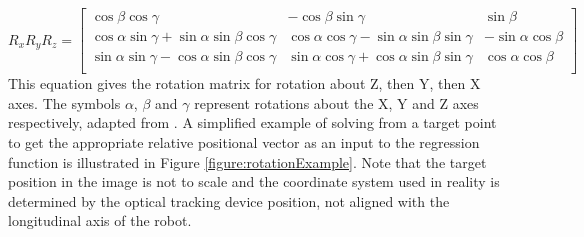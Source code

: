 \documentclass[11pt]{article}
\begin{document}
\begin{equation}\label{equation:rotationMatrix}
R_{x}R_{y}R_{z} = 
\begin{bmatrix*}
\cos\beta\cos\gamma & -\cos\beta\sin\gamma & \sin\beta \\
\cos\alpha\sin\gamma + \sin\alpha\sin\beta\cos\gamma & \cos\alpha\cos\gamma - \sin\alpha\sin\beta\sin\gamma & -\sin\alpha\cos\beta \\
\sin\alpha\sin\gamma - \cos\alpha\sin\beta\cos\gamma & \sin\alpha\cos\gamma + \cos\alpha\sin\beta\sin\gamma & \cos\alpha\cos\beta \\
\end{bmatrix*}
\end{equation}
This equation gives the rotation matrix for rotation about Z, then Y, then X axes. The symbols $\alpha$, $\beta$ and $\gamma$ represent rotations about the X, Y and Z axes respectively, adapted from \cite{3drotation}. A simplified example of solving from a target point to get the appropriate relative positional vector as an input to the regression function is illustrated in Figure \ref{figure:rotationExample}. Note that the target position in the image is not to scale and the coordinate system used in reality is determined by the optical tracking device position, not aligned with the longitudinal axis of the robot. 
\end{document}
